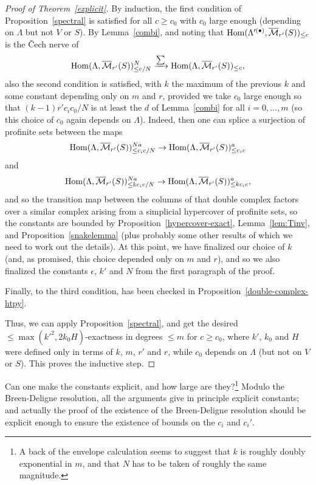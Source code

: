 \begin{proof}[Proof of Theorem~\ref{explicit}]

By induction, the first condition of Proposition~\ref{spectral} is satisfied for all $c\geq c_0$ with $c_0$ large enough (depending on $\Lambda$ but not $V$ or $S$). By Lemma~\ref{combi}, and noting that $\operatorname{Hom}(\Lambda'^{(\bullet)},\overline{\mathcal M}_{r'}(S))_{\leq c}$ is the \v{C}ech nerve of
\[
\operatorname{Hom}(\Lambda,\overline{\mathcal M}_{r'}(S))_{\leq c/N}^N\xrightarrow{\sum} \operatorname{Hom}(\Lambda,\overline{\mathcal M}_{r'}(S))_{\leq c},
\]
also the second condition is satisfied, with $k$ the maximum of the previous $k$ and some constant depending only on $m$ and $r$, provided we take $c_0$ large enough so that $(k-1)r'c_ic_0/N$ is at least the $d$ of Lemma~\ref{combi} for all $i=0,\ldots,m$ (so this choice of $c_0$ again depends on $\Lambda$). Indeed, then one can splice a surjection of profinite sets between the maps
\[
\operatorname{Hom}(\Lambda,\overline{\mathcal M}_{r'}(S))_{\leq c_ic/N}^{Na}\to\operatorname{Hom}(\Lambda,\overline{\mathcal M}_{r'}(S))_{\leq c_ic}^a
\]
and
\[
\operatorname{Hom}(\Lambda,\overline{\mathcal M}_{r'}(S))_{\leq kc_ic/N}^{Na}\to \operatorname{Hom}(\Lambda,\overline{\mathcal M}_{r'}(S))_{\leq kc_ic}^a,
\]
and so the transition map between the columns of that double complex factors over a similar complex arising from a simplicial hypercover of profinite sets, so the constants are bounded by Proposition~\ref{hypercover-exact},
	Lemma~\ref{lem:Tinv},
	and Proposition~\ref{snakelemma}
	(plus probably some other results of which we need to work out the details).
	At this point, we have finalized our choice of $k$ (and, as promised, this choice depended only on $m$ and $r$), and so we also finalized the constants $\epsilon$, $k'$ and $N$ from the first paragraph of the proof.

Finally, to the third condition, has been checked in Proposition~\ref{double-complex-htpy}.

Thus, we can apply Proposition~\ref{spectral}, and get the desired $\leq \max(k'^2,2k_0H)$-exactness in degrees $\leq m$ for $c\geq c_0$, where $k'$, $k_0$ and $H$ were defined only in terms of $k$, $m$, $r'$ and $r$, while $c_0$ depends on $\Lambda$ (but not on $V$ or $S$). This proves the inductive step.
\end{proof}

\begin{question} Can one make the constants explicit, and how large are they?\footnote{A back of the envelope calculation seems to suggest that $k$ is roughly doubly exponential in $m$, and that $N$ has to be taken of roughly the same magnitude.} Modulo the Breen-Deligne resolution, all the arguments give in principle explicit constants; and actually the proof of the existence of the Breen-Deligne resolution should be explicit enough to ensure the existence of bounds on the $c_i$ and $c_i'$.
\end{question}

